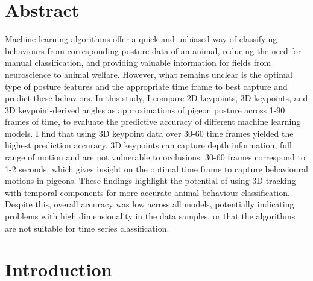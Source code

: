 \documentclass[11pt, letterpaper]{article} %
\begin{document}

\newpage
    
\section{Abstract}

    Machine learning algorithms offer a quick and unbiased way of classifying behaviours from corresponding posture data of an animal, reducing the need for manual classification, and providing valuable information for fields from neuroscience to animal welfare. However, what remains unclear is the optimal type of posture features and the appropriate time frame to best capture and predict these behaviors.
    In this study, I compare 2D keypoints, 3D keypoints, and 3D keypoint-derived angles as approximations of pigeon posture across 1-90 frames of time, to evaluate the predictive accuracy of different machine learning models.
    I find that using 3D keypoint data over 30-60 time frames yielded the highest prediction accuracy. 
    3D keypoints can capture depth information, full range of motion and are not vulnerable to occlusions. 30-60 frames correspond to 1-2 seconds, which gives insight on the optimal time frame to capture behavioural motions in pigeons. These findings highlight the potential of using 3D tracking with temporal components for more accurate animal behaviour classification. Despite this, overall accuracy was low across all models, potentially indicating problems with high dimensionality in the data samples, or that the algorithms are not suitable for time series classification.
    
    

\section{Introduction}
    
\end{document}
